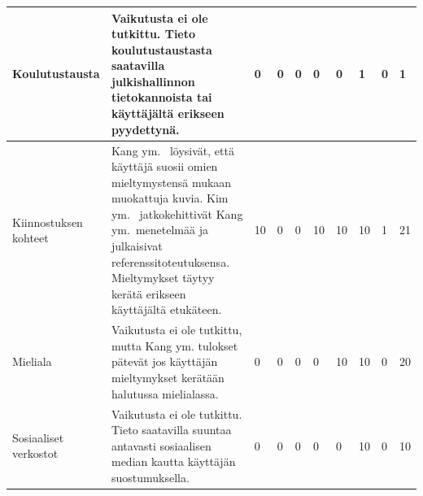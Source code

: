 \documentclass[finnish, 12pt, a4paper, elec, utf8, a-1b]{aaltothesis}
\begin{document}
{\begin{longtable}{p{2.5cm}|p{6cm}|p{0.5cm}p{0.5cm}p{0.5cm}|p{0.5cm}|p{0.5cm}p{0.5cm}p{0.5cm}|p{0.5cm}|}
    \midrule
    Koulutustausta                         & Vaikutusta ei ole tutkittu. Tieto koulutustaustasta saatavilla julkishallinnon tietokannoista tai käyttäjältä erikseen pyydettynä.                                                                                                                                                                                                                                    & 0                                          & 0                                   & 0                                      & 0                            & 0                                               & 1                                         & 0                                         & 1                            \\
    \midrule
    Kiinnostuksen kohteet                  & Kang ym.~\cite{5539850} löysivät, että käyttäjä suosii omien mieltymystensä mukaan muokattuja kuvia. Kim ym.~\cite{10.1007/978-3-030-58577-8_23} jatkokehittivät Kang ym.~menetelmää ja julkaisivat referenssitoteutuksensa. Mieltymykset täytyy kerätä erikseen käyttäjältä etukäteen.                                                                               & 10                                         & 0                                   & 0                                      & 10                           & 10                                              & 10                                        & 1                                         & 21                           \\
    \midrule
    Mieliala                               & Vaikutusta ei ole tutkittu, mutta Kang ym.\cite{5539850} tulokset pätevät jos käyttäjän mieltymykset kerätään halutussa mielialassa.                                                                                                                                                                                                                                  & 0                                          & 0                                   & 0                                      & 0                            & 10                                              & 10                                        & 0                                         & 20                           \\
    \midrule
    Sosiaaliset verkostot                  & Vaikutusta ei ole tutkittu. Tieto saatavilla suuntaa antavasti sosiaalisen median kautta käyttäjän suostumuksella.                                                                                                                                                                                                                                                    & 0                                          & 0                                   & 0                                      & 0                            & 0                                               & 10                                        & 0                                         & 10                           \\

\end{longtable}}
\end{document}
